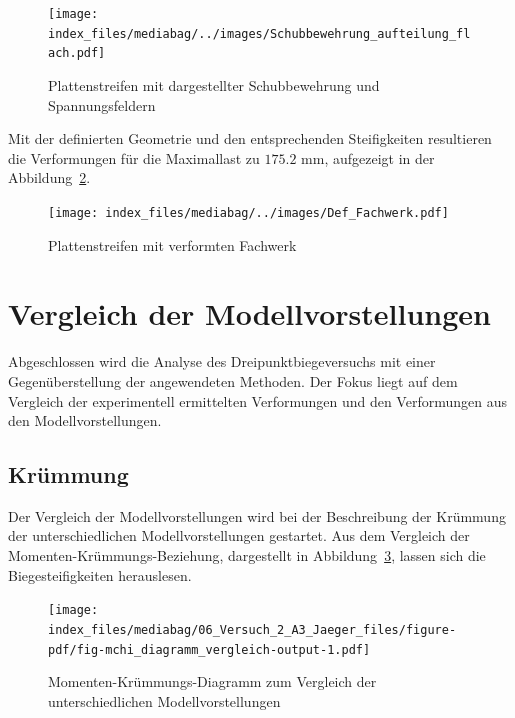 \documentclass[
  12pt,
  letterpaper,
  egregdoesnotlikesansseriftitles]{scrreprt}
\begin{document}
\begin{figure}[H]

{\centering \texttt{[image: index\_files/mediabag/../images/Schubbewehrung\_aufteilung\_flach.pdf]}

}

\caption{\label{fig-schubbew_fw_flach}Plattenstreifen mit dargestellter
Schubbewehrung und Spannungsfeldern}

\end{figure}

Mit der definierten Geometrie und den entsprechenden Steifigkeiten
resultieren die Verformungen für die Maximallast zu
\(175.2 \text{ mm}\), aufgezeigt in der
Abbildung~\ref{fig-deformation_fw}.

\begin{figure}[H]

{\centering \texttt{[image: index\_files/mediabag/../images/Def\_Fachwerk.pdf]}

}

\caption{\label{fig-deformation_fw}Plattenstreifen mit verformten
Fachwerk}

\end{figure}

\hypertarget{vergleich-der-modellvorstellungen}{%
\section{Vergleich der
Modellvorstellungen}\label{vergleich-der-modellvorstellungen}}

Abgeschlossen wird die Analyse des Dreipunktbiegeversuchs mit einer
Gegenüberstellung der angewendeten Methoden. Der Fokus liegt auf dem
Vergleich der experimentell ermittelten Verformungen und den
Verformungen aus den Modellvorstellungen.

\hypertarget{kruxfcmmung}{%
\subsection{Krümmung}\label{kruxfcmmung}}

Der Vergleich der Modellvorstellungen wird bei der Beschreibung der
Krümmung der unterschiedlichen Modellvorstellungen gestartet. Aus dem
Vergleich der Momenten-Krümmungs-Beziehung, dargestellt in
Abbildung~\ref{fig-mchi_diagramm_vergleich}, lassen sich die
Biegesteifigkeiten herauslesen.

\begin{figure}[H]

{\centering \texttt{[image: index\_files/mediabag/06\_Versuch\_2\_A3\_Jaeger\_files/figure-pdf/fig-mchi\_diagramm\_vergleich-output-1.pdf]}

}

\caption{\label{fig-mchi_diagramm_vergleich}Momenten-Krümmungs-Diagramm
zum Vergleich der unterschiedlichen Modellvorstellungen}

\end{figure}
\end{document}
